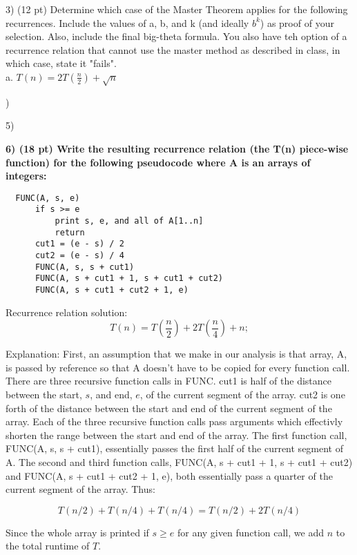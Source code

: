 \documentclass[12pt, a4paper]{article}
\begin{document}
3) (12 pt) Determine which case of the Master Theorem applies for the following recurrences. Include the values of
a, b, and k (and ideally $b^k$) as proof of your selection. Also, include the final big-theta formula. 
You also have teh option of a recurrence relation that cannot use the master method as described in class, 
in which case, state it "fails". \\

  a. $ T(n) = 2T (\frac{n}{2}) + \sqrt{n} $


)

5)

\textbf{6) (18 pt) Write the resulting recurrence relation (the T(n) piece-wise function) for the
following pseudocode where A is an arrays of integers: } \\

\begin{lstlisting}
  FUNC(A, s, e)
      if s >= e
          print s, e, and all of A[1..n]
          return
      cut1 = (e - s) / 2
      cut2 = (e - s) / 4
      FUNC(A, s, s + cut1)
      FUNC(A, s + cut1 + 1, s + cut1 + cut2)
      FUNC(A, s + cut1 + cut2 + 1, e)
\end{lstlisting} 

Recurrence relation solution: 
\[
  T(n) = T \left( \frac{n}{2} \right) + 2T \left( \frac{n}{4} \right) + n;
\]

Explanation: First, an assumption that we make in our analysis is that
array, A, is passed by reference so that A doesn't have to be copied 
for every function call. 
There are three recursive function calls in FUNC. 
cut1 is half of the distance between the start, $s$, and end, $e$, of the current segment 
of the array. cut2 is one forth of the distance between the start and end
of the current segment of the array.
Each of the three recursive function calls pass arguments which effectivly shorten the range 
between the start and end of the array.
The first function call, FUNC(A, s, s + cut1), essentially passes the first half of the current
segment of A.  
The second and third function calls, FUNC(A, s + cut1 + 1, s + cut1 + cut2) and 
FUNC(A, s + cut1 + cut2 + 1, e), both essentially pass a quarter of the current segment of 
the array.
Thus: 

\[ 
  T(n/2) + T(n/4) + T(n/4) = T(n/2) + 2T(n/4)
\]

Since the whole array is printed if $ s \geq e $ for any given function call, we add $ n $ to the total runtime 
of $T$.
\end{document}
